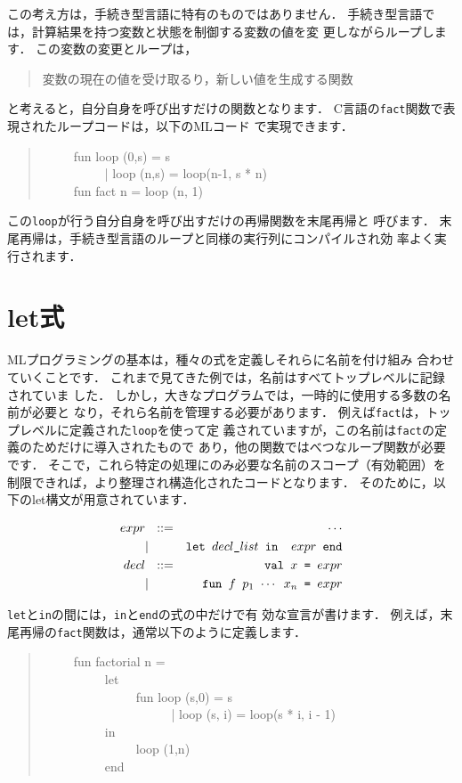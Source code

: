 \documentclass{jbook}
\newcommand{\myem}{\ \ \ \ \  }
\newcommand{\myfm}{ \ \ \ \ \ }
\begin{document}
	この考え方は，手続き型言語に特有のものではありません．
	手続き型言語では，計算結果を持つ変数と状態を制御する変数の値を変
更しながらループします．
	この変数の変更とループは，
\begin{quote}
変数の現在の値を受け取るり，新しい値を生成する関数
\end{quote}
と考えると，自分自身を呼び出すだけの関数となります．
	C言語の{\tt fact}関数で表現されたループコードは，以下のMLコード
で実現できます．
\begin{tt}
\begin{quote}
\myem  fun loop (0,s) = s\\
\myem \ \ \ \ \    | loop (n,s) = loop(n-1, s * n)\\
\myem fun fact n = loop (n, 1)
\end{quote}
\end{tt}
	この{\tt loop}が行う自分自身を呼び出すだけの再帰関数を末尾再帰と
呼びます．
	末尾再帰は，手続き型言語のループと同様の実行列にコンパイルされ効
率よく実行されます．

\section{let式}
\label{sec:tutorialLetexpression}

	MLプログラミングの基本は，種々の式を定義しそれらに名前を付け組み
合わせていくことです．
	これまで見てきた例では，名前はすべてトップレベルに記録されていま
した．
	しかし，大きなプログラムでは，一時的に使用する多数の名前が必要と
なり，それら名前を管理する必要があります．
	例えば{\tt fact}は，トップレベルに定義された{\tt loop}を使って定
義されていますが，この名前は{\tt fact}の定義のためだけに導入されたもので
あり，他の関数ではべつなループ関数が必要です．
	そこで，これら特定の処理にのみ必要な名前のスコープ（有効範囲）を
制限できれば，より整理され構造化されたコードとなります．
	そのために，以下のlet構文が用意されています．
\begin{tt}
\begin{eqnarray*}
expr &\mbox{\ \ }::=& \cdots \\
     &|& \mbox{\tt let\ $decl\_list$\ in \ $expr$\ end}
\\
decl &\mbox{\ \ }::=& \mbox{\tt val\ $x$ = $expr$}
\\
     &|& \mbox{\tt fun\ $f$\ $p_1$ $\cdots$ $x_n$ =  $expr$}
\end{eqnarray*}
\end{tt}
	{\tt let}と{\tt in}の間には，{\tt in}と{\tt end}の式の中だけで有
効な宣言が書けます．
	例えば，末尾再帰の{\tt fact}関数は，通常以下のように定義します．
\begin{tt}
\begin{quote}
\myem  fun factorial n =
\\\myem\myem    let
\\\myem\myem\myem      fun loop (s,0) = s
\\\myem\myem\myem\myfm        | loop (s, i) = loop(s * i, i - 1)
\\\myem\myem    in
\\\myem\myem\myem      loop (1,n)
\\\myem\myem    end
\end{quote}
\end{tt}
\end{document}
